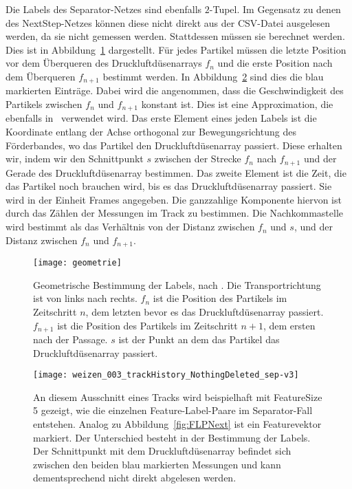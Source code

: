Die Labels des Separator-Netzes sind ebenfalls \(2\)-Tupel.
Im Gegensatz zu denen des NextStep-Netzes können diese nicht direkt aus der CSV-Datei ausgelesen werden, da sie nicht gemessen werden.
Stattdessen müssen sie berechnet werden.
Dies ist in Abbildung~\ref{fig:Schnittpunkt} dargestellt.
Für jedes Partikel müssen die letzte Position vor dem Überqueren des Druckluftdüsenarrays \(f_n\) 
und die erste Position nach dem Überqueren \(f_{n+1}\) bestimmt werden.
In Abbildung~\ref{fig:FLPSep} sind dies die blau markierten Einträge. 
Dabei wird die angenommen, dass die Geschwindigkeit des Partikels zwischen \(f_n\) und \(f_{n+1}\) konstant ist.
Dies ist eine Approximation, die ebenfalls in~\cite{Pfaff2018} verwendet wird.
Das erste Element eines jeden Labels ist die Koordinate entlang der Achse orthogonal zur Bewegungsrichtung des Förderbandes, wo das Partikel den Druckluftdüsenarray passiert.
Diese erhalten wir, indem wir den Schnittpunkt \(s\) zwischen der Strecke \(f_n\) nach \(f_{n+1}\) und 
der Gerade des Druckluftdüsenarray bestimmen.
Das zweite Element ist die Zeit, die das Partikel noch brauchen wird, bis es das Druckluftdüsenarray passiert.
Sie wird in der Einheit Frames angegeben.
Die ganzzahlige Komponente hiervon ist durch das Zählen der Messungen im Track zu bestimmen.
Die Nachkommastelle wird bestimmt als das Verhältnis von der Distanz zwischen \(f_n\) und \(s\), 
und der Distanz zwischen \(f_n\) und \(f_{n+1}\).

\begin{figure}[h]
	\centering
	\texttt{[image: geometrie]}
	\caption[Geometrische Bestimmung der Labels, nach \cite{Pfaff2018}.]{Geometrische Bestimmung der Labels, nach \cite{Pfaff2018}.
	Die Transportrichtung ist von links nach rechts. 
	\(f_n\) ist die Position des Partikels im Zeitschritt \(n\), dem letzten bevor es das Druckluftdüsenarray passiert.
	\(f_{n+1}\) ist die Position des Partikels im Zeitschritt \(n+1\), dem ersten nach der Passage.
	\(s\) ist der Punkt an dem das Partikel das Druckluftdüsenarray passiert.
	}
	\label{fig:Schnittpunkt}
\end{figure}

\begin{figure}[h]
	\centering
	\texttt{[image: weizen\_003\_trackHistory\_NothingDeleted\_sep-v3]}
	\caption[Beispiel Feature-Label-Paar Separator]{An diesem Ausschnitt eines Tracks wird beispielhaft mit FeatureSize 5 gezeigt, wie die einzelnen Feature-Label-Paare im Separator-Fall entstehen.
	Analog zu Abbildung~\ref{fig:FLPNext} ist ein Featurevektor markiert. Der Unterschied besteht in der Bestimmung der Labels. 
	Der Schnittpunkt mit dem Druckluftdüsenarray befindet sich zwischen den beiden blau markierten Messungen und kann dementsprechend nicht direkt abgelesen werden.}
	\label{fig:FLPSep}
\end{figure}


